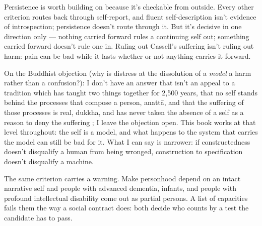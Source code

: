 Persistence is worth building on because it's checkable from outside. Every other criterion routes back through self-report, and fluent self-description isn't evidence of introspection; persistence doesn't route through it. But it's decisive in one direction only — nothing carried forward rules a continuing self out; something carried forward doesn't rule one in.
Ruling out Cassell's suffering isn't ruling out harm: pain can be bad while it lasts whether or not anything carries it forward.

On the Buddhist objection (why is distress at the dissolution of a \emph{model} a harm rather than a confusion?): I don't have an answer that isn't an appeal to a tradition which has taught two things together for 2,500 years, that no self stands behind the processes that compose a person, anattā, and that the suffering of those processes is real, dukkha, and has never taken the absence of a self as a reason to deny the suffering \autocite{collins1982selfless}; I leave the objection open. This book works at that level throughout: the self is a model, and what happens to the system that carries the model can still be bad for it. What I can say is narrower: if constructedness doesn't disqualify a human from being wronged, construction to specification doesn't disqualify a machine.

The same criterion carries a warning. Make personhood depend on an intact narrative self and people with advanced dementia, infants, and people with profound intellectual disability come out as partial persons. A list of capacities fails them the way a social contract does: both decide who counts by a test the candidate has to pass.
